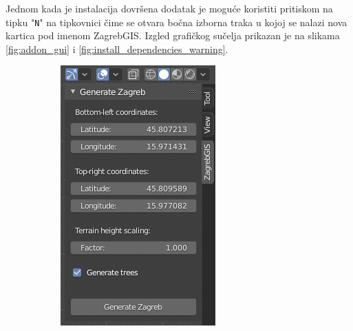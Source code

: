 \documentclass[times, utf8, zavrsni, numeric]{fer}
\begin{document}
	Jednom kada je instalacija dovršena dodatak je moguće koristiti pritiskom na tipku "\texttt{N}" na tipkovnici čime se otvara bočna izborna traka  u kojoj se nalazi nova kartica  pod imenom ZagrebGIS.
	Izgled grafičkog sučelja prikazan je na slikama \ref{fig:addon_gui} i \ref{fig:install_dependencies_warning}.
	
	\begin{figure}[ht]
		\centering
		\begin{subfigure}[t]{.317\textwidth}
			\includegraphics[width=\linewidth,left]{figures/addon_gui.png}
			\captionsetup{margin=.4cm}

\end{subfigure}
\end{figure}
\end{document}
